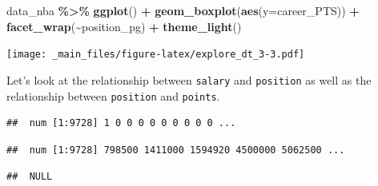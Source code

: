 \documentclass[
]{book}
\newenvironment{Shaded}{\begin{snugshade}}{\end{snugshade}}
\newcommand{\AttributeTok}[1]{\textcolor[rgb]{0.13,0.29,0.53}{#1}}
\newcommand{\FunctionTok}[1]{\textcolor[rgb]{0.13,0.29,0.53}{\textbf{#1}}}
\newcommand{\NormalTok}[1]{#1}
\newcommand{\SpecialCharTok}[1]{\textcolor[rgb]{0.81,0.36,0.00}{\textbf{#1}}}
\begin{document}
\begin{Shaded}
\begin{Highlighting}[]
\NormalTok{data\_nba }\SpecialCharTok{\%\textgreater{}\%} \FunctionTok{ggplot}\NormalTok{() }\SpecialCharTok{+} 
\FunctionTok{geom\_boxplot}\NormalTok{(}\FunctionTok{aes}\NormalTok{(}\AttributeTok{y=}\NormalTok{career\_PTS)) }\SpecialCharTok{+}
  \FunctionTok{facet\_wrap}\NormalTok{(}\SpecialCharTok{\textasciitilde{}}\NormalTok{position\_pg) }\SpecialCharTok{+}
  \FunctionTok{theme\_light}\NormalTok{()}
\end{Highlighting}
\end{Shaded}

\texttt{[image: \_main\_files/figure-latex/explore\_dt\_3-3.pdf]}

Let's look at the relationship between \texttt{salary} and \texttt{position} as well as the
relationship between \texttt{position} and \texttt{points}.

\begin{Shaded}
\end{Shaded}

\begin{verbatim}
##  num [1:9728] 1 0 0 0 0 0 0 0 0 0 ...
\end{verbatim}

\begin{Shaded}
\end{Shaded}

\begin{verbatim}
##  num [1:9728] 798500 1411000 1594920 4500000 5062500 ...
\end{verbatim}

\begin{Shaded}
\end{Shaded}

\begin{verbatim}
##  NULL
\end{verbatim}
\end{document}
